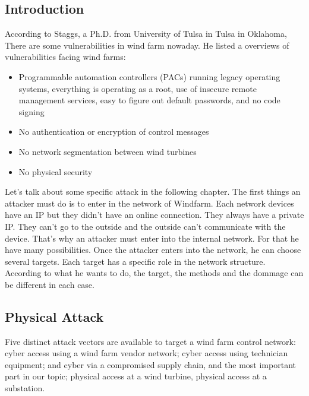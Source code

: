 \documentclass[twosided,a4,10pt]{article}
\begin{document}
\begin{multicols}{2}
\subsection{Introduction}
 According to Staggs, a Ph.D. from University of Tulsa in Tulsa in Oklahoma, There are some vulnerabilities in wind farm nowaday. He listed a overviews of vulnerabilities facing wind farms:
 \begin{itemize}
     \item Programmable automation controllers (PACs) running legacy operating systems, everything is operating as a root, use of insecure remote management services, easy to figure out default passwords, and no code signing
    \item	No authentication or encryption of control messages
    \item	No network segmentation between wind turbines
    \item	No physical security
 \end{itemize}
 Let's talk about some specific attack in the following chapter. The first things an attacker must do is to enter in the network of Windfarm. Each network devices have an IP but they didn't have an online connection. They always have a private IP. They can't go to the outside and the outside can't communicate with the device. That's why an attacker must enter into the internal network. For that he have many possibilities. Once the attacker enters into the network, he can choose several targets. Each target has a specific role in the network structure. According to what he wants to do, the target, the methods and the dommage can be different in each case.
 


\subsection{Physical Attack}
Five distinct attack vectors are available to target a wind farm control network: cyber access using a wind farm vendor network; cyber access using technician equipment; and cyber via a compromised supply chain, and the most important part in our topic; physical access at a wind turbine, physical access at a substation.

\end{multicols}
\end{document}
